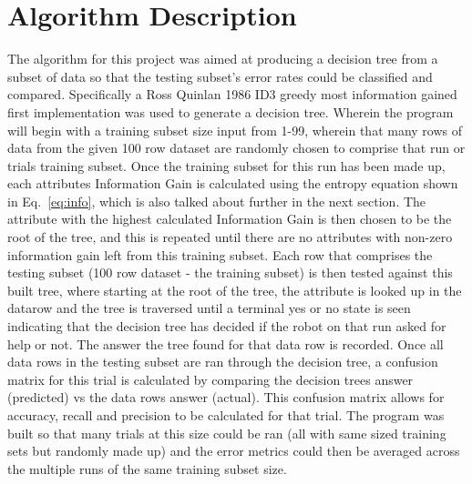 \documentclass[conference]{IEEEtran}
\begin{document}
\section{Algorithm Description}
    The algorithm for this project was aimed at producing a decision tree from a subset of data so that the testing subset's error rates could be classified and compared. Specifically a Ross Quinlan 1986 ID3 greedy most information gained first implementation was used to generate a decision tree. Wherein the program will begin with a training subset size input from 1-99, wherein that many rows of data from the given 100 row dataset are randomly chosen to comprise that run or trials training subset. Once the training subset for this run has been made up, each attributes Information Gain is calculated using the entropy equation shown in Eq.~\eqref{eq:info}, which is also talked about further in the next section. The attribute with the highest calculated Information Gain is then chosen to be the root of the tree, and this is repeated until there are no attributes with non-zero information gain left from this training subset. Each row that comprises the testing subset (100 row dataset - the training subset) is then tested against this built tree, where starting at the root of the tree, the attribute is looked up in the datarow and the tree is traversed until a terminal yes or no state is seen indicating that the decision tree has decided if the robot on that run asked for help or not. The answer the tree found for that data row is recorded. Once all data rows in the testing subset are ran through the decision tree, a confusion matrix for this trial is calculated by comparing the decision trees answer (predicted) vs the data rows answer (actual). This confusion matrix allows for accuracy, recall and precision to be calculated for that trial. The program was built so that many trials at this size could be ran (all with same sized training sets but randomly made up) and the error metrics could then be averaged across the multiple runs of the same training subset size. 
\end{document}
